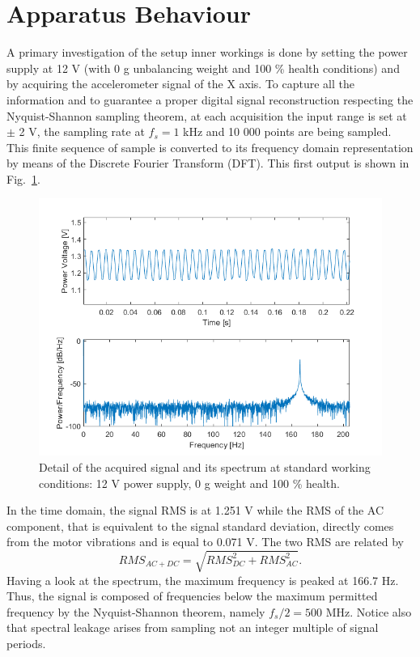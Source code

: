 \documentclass[12pt]{article}
\begin{document}
\section{Apparatus Behaviour}
A primary investigation of the setup inner workings is done by setting the power supply at 12 V (with 0 g unbalancing weight and 100 \% health conditions) and by acquiring the accelerometer signal of the X axis. To capture all the information and to guarantee a proper digital signal reconstruction respecting the Nyquist-Shannon sampling theorem, at each acquisition the input range is set at $\pm$ 2 V, the sampling rate at $f_s=1$ kHz and 10 000 points are being sampled. This finite sequence of sample is converted to its frequency domain representation by means of the Discrete Fourier Transform (DFT). This first output is shown in Fig.~\ref{fig:refsignal}.	    
	\begin{figure}[h]
	   	\centering
	   	\includegraphics[width=0.9\linewidth]{Figures/RefSignal}
	   	\caption{Detail of the acquired signal and its spectrum at standard working conditions: 12 V power supply, 0 g weight and 100 \% health.}
	   	\label{fig:refsignal}
	\end{figure}
In the time domain, the signal RMS is at 1.251 V while the RMS of the AC component, that is equivalent to the signal standard deviation, directly comes from the motor vibrations and is equal to 0.071 V. The two RMS are related by
\begin{equation}
RMS_{AC+DC}=\sqrt{RMS^2_{DC}+RMS^2_{AC}}.
\end{equation} 
Having a look at the spectrum, the maximum frequency is peaked at 166.7 Hz. Thus, the signal is composed of frequencies below the maximum permitted frequency by the Nyquist-Shannon theorem, namely $f_s/2=500$ MHz. Notice also that spectral leakage arises from sampling not an integer multiple of signal periods. 
\end{document}
